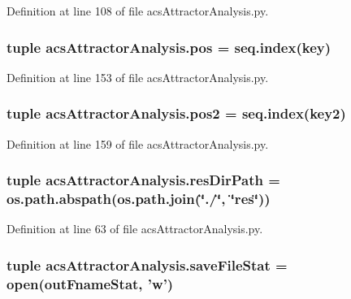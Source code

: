 Definition at line 108 of file acs\-Attractor\-Analysis.\-py.

\hypertarget{a00096_abae060beb170fe923fc10b75f9e82079}{
\subsubsection[{pos}]{\setlength{\rightskip}{0pt plus 5cm}tuple acs\-Attractor\-Analysis.\-pos = {\bf seq.\-index}(key)}}\label{a00096_abae060beb170fe923fc10b75f9e82079}


Definition at line 153 of file acs\-Attractor\-Analysis.\-py.

\hypertarget{a00096_a6ab79d8205f5d0ae2da47fb0af93149a}{
\subsubsection[{pos2}]{\setlength{\rightskip}{0pt plus 5cm}tuple acs\-Attractor\-Analysis.\-pos2 = {\bf seq.\-index}(key2)}}\label{a00096_a6ab79d8205f5d0ae2da47fb0af93149a}


Definition at line 159 of file acs\-Attractor\-Analysis.\-py.

\hypertarget{a00096_a35eb3b681c7408f1476b92798d4f2c16}{
\subsubsection[{res\-Dir\-Path}]{\setlength{\rightskip}{0pt plus 5cm}tuple acs\-Attractor\-Analysis.\-res\-Dir\-Path = os.\-path.\-abspath(os.\-path.\-join(\char`\"{}./\char`\"{}, \char`\"{}res\char`\"{}))}}\label{a00096_a35eb3b681c7408f1476b92798d4f2c16}


Definition at line 63 of file acs\-Attractor\-Analysis.\-py.

\hypertarget{a00096_acc1016f353d0e1b36c837cb0b480edef}{
\subsubsection[{save\-File\-Stat}]{\setlength{\rightskip}{0pt plus 5cm}tuple acs\-Attractor\-Analysis.\-save\-File\-Stat = open({\bf out\-Fname\-Stat}, 'w')}}\label{a00096_acc1016f353d0e1b36c837cb0b480edef}


